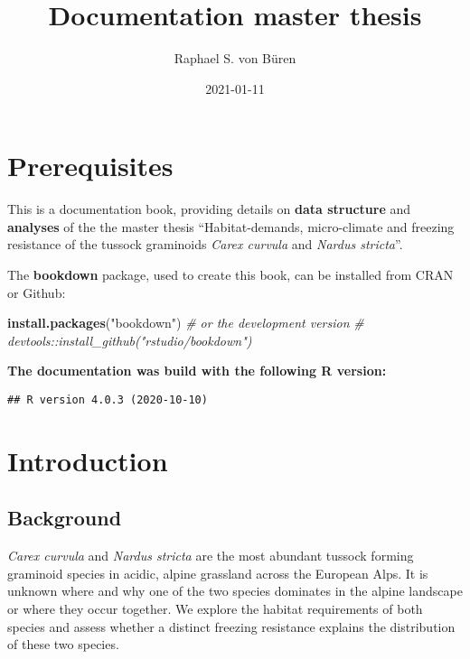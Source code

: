 \documentclass[
]{book}
\title{Documentation master thesis}
\author{Raphael S. von Büren}
\date{2021-01-11}
\newenvironment{Shaded}{\begin{snugshade}}{\end{snugshade}}
\newcommand{\CommentTok}[1]{\textcolor[rgb]{0.56,0.35,0.01}{\textit{#1}}}
\newcommand{\KeywordTok}[1]{\textcolor[rgb]{0.13,0.29,0.53}{\textbf{#1}}}
\newcommand{\NormalTok}[1]{#1}
\newcommand{\StringTok}[1]{\textcolor[rgb]{0.31,0.60,0.02}{#1}}
\begin{document}
\maketitle

{
\setcounter{tocdepth}{1}
\tableofcontents
}
\hypertarget{prerequisites}{%
\chapter{Prerequisites}\label{prerequisites}}

This is a documentation book, providing details on \textbf{data structure} and \textbf{analyses} of the the master thesis ``Habitat-demands, micro-climate and freezing resistance of the tussock graminoids \emph{Carex curvula} and \emph{Nardus stricta}''.

The \textbf{bookdown} package, used to create this book, can be installed from CRAN or Github:

\begin{Shaded}
\begin{Highlighting}[]
\KeywordTok{install.packages}\NormalTok{(}\StringTok{"bookdown"}\NormalTok{)}
\CommentTok{# or the development version}
\CommentTok{# devtools::install_github("rstudio/bookdown")}
\end{Highlighting}
\end{Shaded}

\textbf{The documentation was build with the following R version:}

\begin{verbatim}
## R version 4.0.3 (2020-10-10)
\end{verbatim}

\hypertarget{intro}{%
\chapter{Introduction}\label{intro}}

\hypertarget{background}{%
\section{Background}\label{background}}

\emph{Carex curvula} and \emph{Nardus stricta} are the most abundant tussock forming graminoid species in acidic, alpine grassland across the European Alps. It is unknown where and why one of the two species dominates in the alpine landscape or where they occur together. We explore the habitat requirements of both species and assess whether a distinct freezing resistance explains the distribution of these two species.
\end{document}
